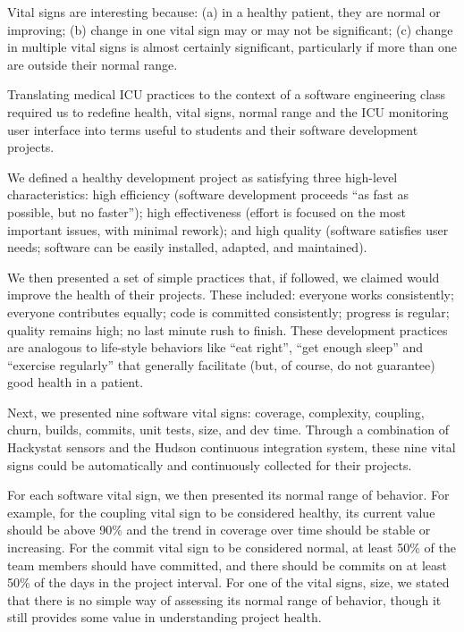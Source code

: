 \documentclass{acm_proc_article-sp}
\begin{document}
Vital signs are interesting because: (a) in a healthy patient, they are
normal or improving; (b) change in one vital sign may or may not be
significant; (c) change in multiple vital signs is almost certainly
significant, particularly if more than one are outside their normal range.

Translating medical ICU practices to the context of a software engineering
class required us to redefine health, vital signs, normal range
and the ICU monitoring user interface into terms useful to students and their
software development projects.

We defined a healthy development project as satisfying three high-level
characteristics: high efficiency (software development proceeds ``as fast
as possible, but no faster''); high effectiveness (effort is focused on the
most important issues, with minimal rework); and high quality (software
satisfies user needs; software can be easily installed, adapted, and
maintained).

We then presented a set of simple practices that, if followed, we claimed
would improve the health of their projects.  These
included: everyone works consistently; everyone contributes equally; code
is committed consistently; progress is regular; quality remains high; no
last minute rush to finish.  These development practices are analogous to
life-style behaviors like ``eat right'', ``get enough sleep'' and
``exercise regularly'' that generally facilitate (but, of course, do not
guarantee) good health in a patient.

Next, we presented nine software vital signs: coverage, complexity,
coupling, churn, builds, commits, unit tests, size, and dev
time. Through a combination of Hackystat sensors and the Hudson continuous
integration system, these nine vital signs could be automatically and
continuously collected for their projects.

For each software vital sign, we then presented its normal range of
behavior.  For example, for the coupling vital sign to be considered
healthy, its current value should be above 90\% and the trend in
coverage over time should be stable or increasing.  For the commit vital
sign to be considered normal, at least 50\% of the team members should have
committed, and there should be commits on at least 50\% of the days in the
project interval.  For one of the vital signs, size, we stated that
there is no simple way of assessing its normal range of behavior, though
it still provides some value in understanding project health.
\end{document}
